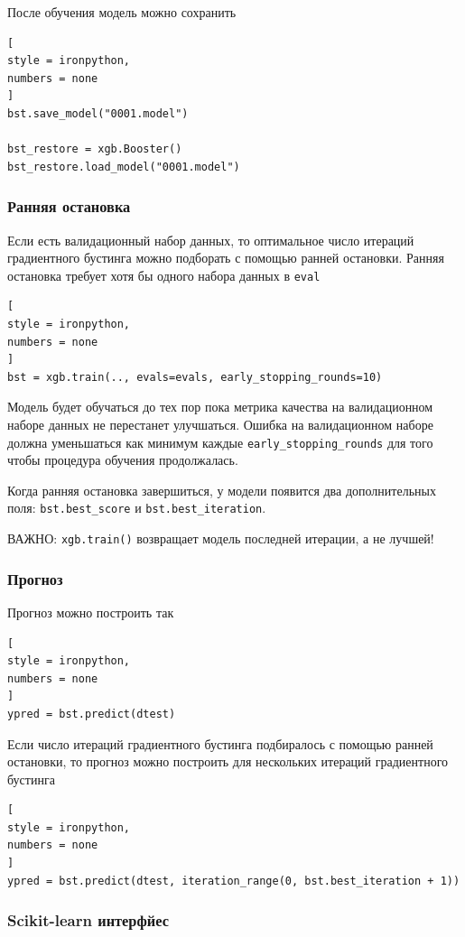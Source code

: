 \documentclass[%
	11pt,
	a4paper,
	utf8,
		]{article}
\begin{document}
После обучения модель можно сохранить 
\begin{lstlisting}[
style = ironpython,
numbers = none
]
bst.save_model("0001.model")

bst_restore = xgb.Booster()
bst_restore.load_model("0001.model")
\end{lstlisting}

\subsubsection{Ранняя остановка}

Если есть валидационный набор данных, то оптимальное число итераций градиентного бустинга можно подборать с помощью ранней остановки. Ранняя остановка требует хотя бы одного набора данных в \verb|eval|
\begin{lstlisting}[
style = ironpython,
numbers = none
]
bst = xgb.train(.., evals=evals, early_stopping_rounds=10)
\end{lstlisting}

Модель будет обучаться до тех пор пока метрика качества на валидационном наборе данных не перестанет улучшаться. Ошибка на валидационном наборе должна уменьшаться как минимум каждые \verb|early_stopping_rounds| для того чтобы процедура обучения продолжалась.

Когда ранняя остановка завершиться, у модели появится два дополнительных поля: \verb|bst.best_score| и \verb|bst.best_iteration|.

ВАЖНО: \verb|xgb.train()| возвращает модель последней итерации, а не лучшей!

\subsubsection{Прогноз}

Прогноз можно построить так
\begin{lstlisting}[
style = ironpython,
numbers = none
]
ypred = bst.predict(dtest)
\end{lstlisting}

Если число итераций градиентного бустинга подбиралось с помощью ранней остановки, то прогноз можно построить для нескольких итераций градиентного бустинга
\begin{lstlisting}[
style = ironpython,
numbers = none
]
ypred = bst.predict(dtest, iteration_range(0, bst.best_iteration + 1))
\end{lstlisting}

\subsubsection{Scikit-learn интерфйес}
\end{document}
